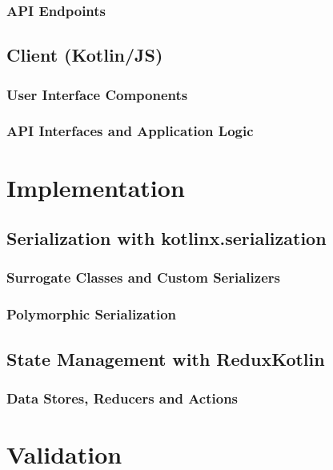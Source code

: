 \documentclass[12pt,a4paper,openright,twoside]{book}
\begin{document}
\subsection{API Endpoints}
\label{ssec:api-endpoints}
\section{Client (Kotlin/JS)}
\label{sec:client-kotlin-js}
\subsection{User Interface Components}
\label{ssec:user-interface-components}
\subsection{API Interfaces and Application Logic}
\label{ssec:api-interfaces-and-application-logic}
\chapter{Implementation}
\label{chap:implementation}
\section{Serialization with kotlinx.serialization}
\label{sec:serialization-with-kotlinx-serialization}
\subsection{Surrogate Classes and Custom Serializers}
\label{ssec:surrogate-classes-and-custom-serializers}
\subsection{Polymorphic Serialization}
\label{ssec:polymorphic-serialization}
\section{State Management with ReduxKotlin}
\label{sec:state-management-with-reduxkotlin}
\subsection{Data Stores, Reducers and Actions}
\label{ssec:data-stores-reducers-and-actions}
\chapter{Validation}
\label{chap:validation}
\end{document}
